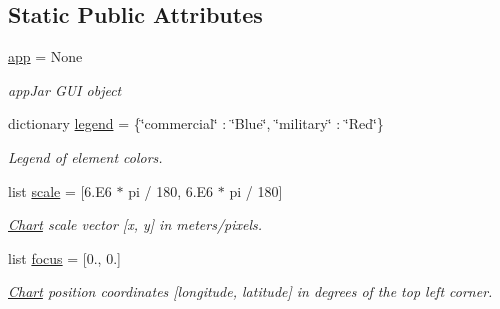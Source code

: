 \subsection*{Static Public Attributes}
\begin{DoxyCompactItemize}
\item 
\mbox{\label{classchart_1_1_chart_a3a4606ea29ff14059be87ab9d21c962d}} 
\hyperlink{classchart_1_1_chart_a3a4606ea29ff14059be87ab9d21c962d}{app} = None
\begin{DoxyCompactList}\small\item\em app\+Jar G\+UI object \end{DoxyCompactList}\item 
\mbox{\label{classchart_1_1_chart_aa86da6b6e5597272d03d109491a380d0}} 
dictionary \hyperlink{classchart_1_1_chart_aa86da6b6e5597272d03d109491a380d0}{legend} = \{\char`\"{}commercial\char`\"{} \+: \char`\"{}Blue\char`\"{}, \char`\"{}military\char`\"{} \+: \char`\"{}Red\char`\"{}\}
\begin{DoxyCompactList}\small\item\em Legend of element colors. \end{DoxyCompactList}\item 
\mbox{\label{classchart_1_1_chart_a9337787b3748de4a6dd722074ff6e7b4}} 
list \hyperlink{classchart_1_1_chart_a9337787b3748de4a6dd722074ff6e7b4}{scale} = \mbox{[}6.\+E6 $\ast$ pi / 180, 6.\+E6 $\ast$ pi / 180\mbox{]}
\begin{DoxyCompactList}\small\item\em \hyperlink{classchart_1_1_chart}{Chart} scale vector \mbox{[}x, y\mbox{]} in meters/pixels. \end{DoxyCompactList}\item 
\mbox{\label{classchart_1_1_chart_ab776802bbb212893c7ec9639ddb95ea7}} 
list \hyperlink{classchart_1_1_chart_ab776802bbb212893c7ec9639ddb95ea7}{focus} = \mbox{[}0., 0.\mbox{]}
\begin{DoxyCompactList}\small\item\em \hyperlink{classchart_1_1_chart}{Chart} position coordinates \mbox{[}longitude, latitude\mbox{]} in degrees of the top left corner. \end{DoxyCompactList}\end{DoxyCompactItemize}


